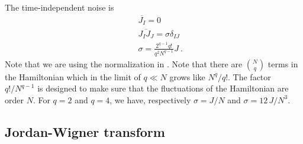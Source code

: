 \documentclass{article}
\theoremstyle{definition}
\newcommand{\nn}{\nonumber}
\begin{document}
    The time-independent noise is
    \begin{eqnarray}
        &&\overline{J_I}=0\nn\\
        &&\overline{J_I J_J}=\sigma \delta_{IJ}\nn\\
        &&\sigma=\frac{2^{q-1}q!}{q^{2}N^{q-1}}J\ .
    \end{eqnarray}
    Note that we are using the normalization in
    \cite{jian2021note,jian2023linear}. Note that there are $\binom{N}{q}$ terms
    in the Hamiltonian which in the limit of $q\ll N$ grows like $N^{q}/q!$. The
    factor $q!/N^{q-1}$ is designed to make sure that the fluctuations of the
    Hamiltonian are order $N$. For $q=2$ and $q=4$, we have, respectively $\sigma
    =J/N$ and $\sigma=12\,J/N^{3}$.

    \subsection{Jordan-Wigner transform}
\end{document}
